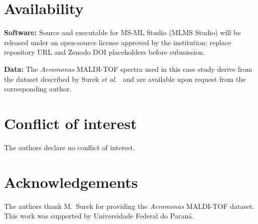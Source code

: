 \documentclass[preprint,12pt]{elsarticle}
\begin{document}
\section*{Availability}
\textbf{Software:} Source and executable for MS-ML Studio (MLMS Studio) will be released under an open-source license approved by the institution; replace repository URL and Zenodo DOI placeholders before submission.

\textbf{Data:} The \textit{Aeromonas} MALDI-TOF spectra used in this case study derive from the dataset described by Surek \textit{et al.}~\cite{Surek2010} and are available upon request from the corresponding author.

\section*{Conflict of interest}
The authors declare no conflict of interest.

\section*{Acknowledgements}
The authors thank M.~Surek for providing the \textit{Aeromonas} MALDI-TOF dataset. This work was supported by Universidade Federal do Paran{\'a}.



\end{document}
